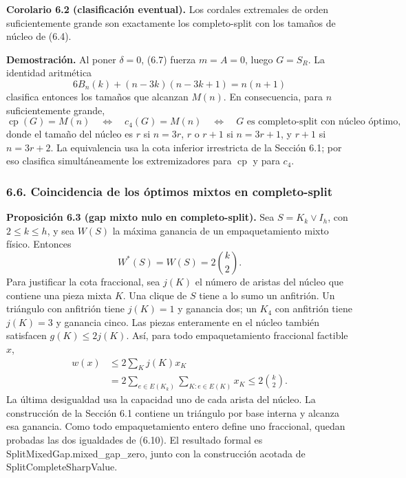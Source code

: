 \documentclass[spanish,11pt,a4paper]{article}
\begin{document}

\textbf{Corolario 6.2 (clasificación eventual).} Los cordales extremales de orden suficientemente grande son exactamente los completo-split con los tamaños de núcleo de (6.4).

\textbf{Demostración.} Al poner \(\delta=0\), (6.7) fuerza \(m=A=0\), luego \(G=S_R\). La identidad aritmética \[
6B_n(k)+(n-3k)(n-3k+1)=n(n+1)
\tag{6.8}
\] clasifica entonces los tamaños que alcanzan \(M(n)\). En consecuencia, para \(n\) suficientemente grande, \[
\operatorname{cp}(G)=M(n)
\quad\Longleftrightarrow\quad
c_4(G)=M(n)
\quad\Longleftrightarrow\quad
G\text{ es completo-split con núcleo óptimo},
\tag{6.9}
\] donde el tamaño del núcleo es \(r\) si \(n=3r\), \(r\) o \(r+1\) si \(n=3r+1\), y \(r+1\) si \(n=3r+2\). La equivalencia usa la cota inferior irrestricta de la Sección 6.1; por eso clasifica simultáneamente los extremizadores para \(\operatorname{cp}\) y para \(c_4\).


\subsubsection{6.6. Coincidencia de los óptimos mixtos en completo-split}\label{coincidencia-de-los-optimos-mixtos-en-completo-split}


\textbf{Proposición 6.3 (gap mixto nulo en completo-split).} Sea \(S=K_k\vee I_h\), con \(2\le k\le h\), y sea \(W(S)\) la máxima ganancia de un empaquetamiento mixto físico. Entonces \[
W^*(S)=W(S)=2\binom k2.
\tag{6.10}
\] Para justificar la cota fraccional, sea \(j(K)\) el número de aristas del núcleo que contiene una pieza mixta \(K\). Una clique de \(S\) tiene a lo sumo un anfitrión. Un triángulo con anfitrión tiene \(j(K)=1\) y ganancia dos; un \(K_4\) con anfitrión tiene \(j(K)=3\) y ganancia cinco. Las piezas enteramente en el núcleo también satisfacen \(g(K)\le2j(K)\). Así, para todo empaquetamiento fraccional factible \(x\), \[
\begin{aligned}
w(x)&\le2\sum_K j(K)x_K\\
&=2\sum_{e\in E(K_k)}\sum_{K:e\in E(K)}x_K
\le2\binom k2.
\end{aligned}
\tag{6.11}
\] La última desigualdad usa la capacidad uno de cada arista del núcleo. La construcción de la Sección 6.1 contiene un triángulo por base interna y alcanza esa ganancia. Como todo empaquetamiento entero define uno fraccional, quedan probadas las dos igualdades de (6.10). El resultado formal es {\ttfamily\small SplitMixedGa\discretionary{\hbox{\ensuremath{\hookrightarrow}}}{}{}p.\discretionary{\hbox{\ensuremath{\hookrightarrow}}}{}{}mixed\_\discretionary{\hbox{\ensuremath{\hookrightarrow}}}{}{}gap\_\discretionary{\hbox{\ensuremath{\hookrightarrow}}}{}{}zero}, junto con la construcción acotada de {\ttfamily\small SplitComplet\discretionary{\hbox{\ensuremath{\hookrightarrow}}}{}{}eSharpValue}.
\end{document}
